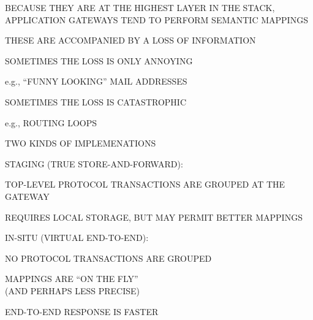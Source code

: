 

\begin{bwslide}

\begin{nrtc}
\item	BECAUSE THEY ARE AT THE HIGHEST LAYER IN THE STACK,
	APPLICATION GATEWAYS TEND TO PERFORM SEMANTIC MAPPINGS

\item	THESE ARE ACCOMPANIED BY A LOSS OF INFORMATION

\item	SOMETIMES THE LOSS IS ONLY ANNOYING
    \begin{nrtc}
    \item	e.g., ``FUNNY LOOKING'' MAIL ADDRESSES
    \end{nrtc}

\item	SOMETIMES THE LOSS IS CATASTROPHIC
    \begin{nrtc}
    \item	e.g., ROUTING LOOPS
    \end{nrtc}
\end{nrtc}
\end{bwslide}


\begin{bwslide}

\begin{nrtc}
\item	TWO KINDS OF IMPLEMENATIONS

\item	STAGING (TRUE STORE-AND-FORWARD):
    \begin{nrtc}
    \item	TOP-LEVEL PROTOCOL TRANSACTIONS ARE GROUPED AT THE GATEWAY

    \item	REQUIRES LOCAL STORAGE, BUT MAY PERMIT BETTER MAPPINGS
    \end{nrtc}

\item	IN-SITU (VIRTUAL END-TO-END):
    \begin{nrtc}
    \item	NO PROTOCOL TRANSACTIONS ARE GROUPED

    \item	MAPPINGS ARE ``ON THE FLY''\\ (AND PERHAPS LESS PRECISE)

    \item	END-TO-END RESPONSE IS FASTER
    \end{nrtc}
\end{nrtc}
\end{bwslide}


